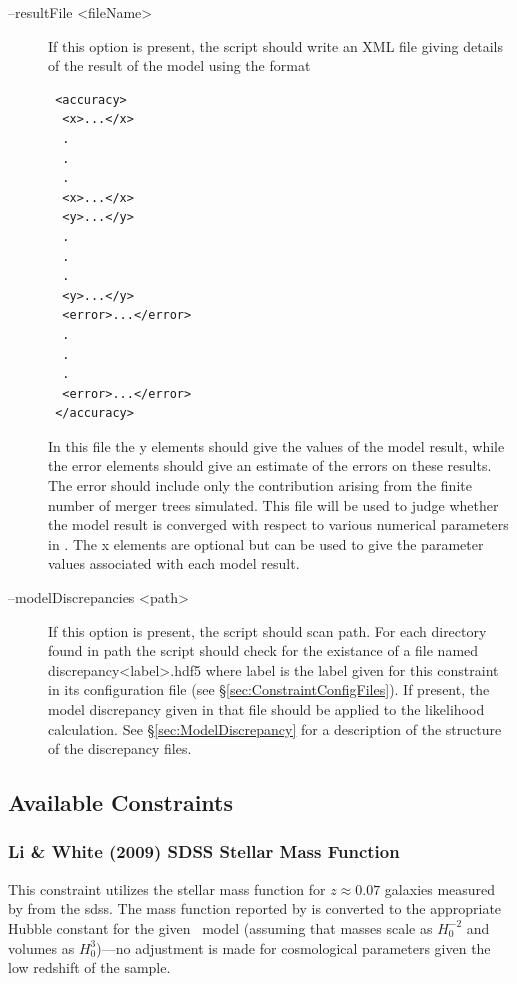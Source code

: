 \begin{description}
 \item [{\normalfont \ttfamily --resultFile <fileName>}] If this option is present, the script should write an XML file giving details of the result of the model using the format
\begin{verbatim}
 <accuracy>
  <x>...</x>
  .
  .
  .
  <x>...</x>
  <y>...</y>
  .
  .
  .
  <y>...</y>
  <error>...</error>
  .
  .
  .
  <error>...</error>
 </accuracy>
\end{verbatim}
In this file the {\normalfont \ttfamily y} elements should give the values of the model result, while the {\normalfont \ttfamily error} elements should give an estimate of the errors on these results. The error should include only the contribution arising from the finite number of merger trees simulated. This file will be used to judge whether the model result is converged with respect to various numerical parameters in \glc. The {\normalfont \ttfamily x} elements are optional but can be used to give the parameter values associated with each model result.
 \item [{\normalfont \ttfamily --modelDiscrepancies <path>}] If this option is present, the script should scan {\normalfont \ttfamily path}. For each directory found in {\normalfont \ttfamily path} the script should check for the existance of a file named {\normalfont \ttfamily discrepancy<label>.hdf5} where {\normalfont \ttfamily label} is the label given for this constraint in its configuration file (see \S\ref{sec:ConstraintConfigFiles}). If present, the model discrepancy given in that file should be applied to the likelihood calculation. See \S\ref{sec:ModelDiscrepancy} for a description of the structure of the discrepancy files.
\end{description}

\subsection{Available Constraints}

\subsubsection{Li \& White (2009) SDSS Stellar Mass Function}

This constraint utilizes the stellar mass function for $z\approx 0.07$ galaxies measured by \cite{li_distribution_2009} from the \gls{sdss}. The mass function reported by \cite{li_distribution_2009} is converted to the appropriate Hubble constant for the given \glc\ model (assuming that masses scale as $H_0^{-2}$ and volumes as $H_0^3$)---no adjustment is made for cosmological parameters given the low redshift of the sample.

